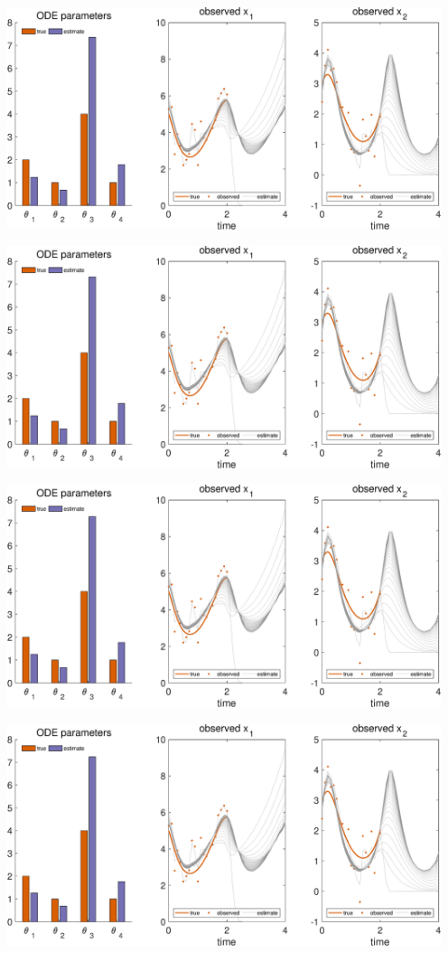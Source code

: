 {\includegraphics [width=5in]{VGM_for_Lotka_Volterra_34.eps}

\includegraphics [width=5in]{VGM_for_Lotka_Volterra_35.eps}

\includegraphics [width=5in]{VGM_for_Lotka_Volterra_36.eps}

\includegraphics [width=5in]{VGM_for_Lotka_Volterra_37.eps}

}
